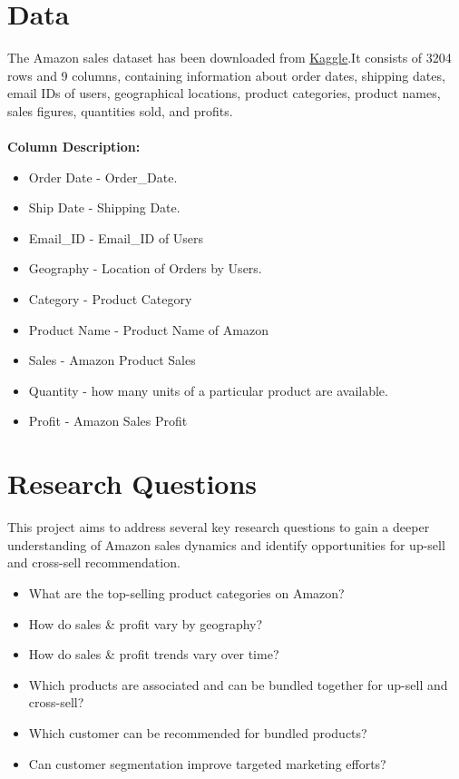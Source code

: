 \documentclass[11pt]{article} %
\begin{document}
\section{Data}
The Amazon sales dataset\cite{1} has been downloaded from \href{https://www.kaggle.com/datasets/anandshaw2001/amazon-sales-dataset}{Kaggle}.It consists of 3204 rows and 9 columns, containing information about order dates, shipping dates, email IDs of users, geographical locations, product categories, product names, sales figures, quantities sold, and profits. \\\\
\textbf{Column Description:}
\begin{itemize}
    \item Order Date - Order\_Date.
    \item Ship Date - Shipping Date.
    \item Email\_ID - Email\_ID of Users
    \item Geography - Location of Orders by Users.
    \item Category - Product Category
    \item Product Name - Product Name of Amazon
    \item Sales - Amazon Product Sales
    \item Quantity - how many units of a particular product are available.
    \item Profit - Amazon Sales Profit
\end{itemize}

\section{Research Questions}
This project aims to address several key research questions to gain a deeper understanding of Amazon sales dynamics and identify opportunities for up-sell and cross-sell recommendation.
\begin{itemize}
    \item What are the top-selling product categories on Amazon?
    \item How do sales \& profit vary by geography?
    \item How do sales \& profit trends vary over time?
    \item Which products are associated and can be bundled together for up-sell and cross-sell?
    \item Which customer can be recommended for bundled products?
    \item Can customer segmentation improve targeted marketing efforts?
\end{itemize}
\end{document}
